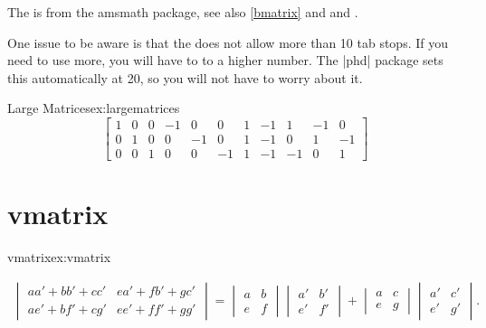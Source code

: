 The  is from the amsmath package, see also \vref{bmatrix} and  and \pageref{bmatrix}. 


One issue to be aware is that the  does not allow more than 10 tab stops. If you need to use more, you will have to  to a higher number. The |phd| package sets this automatically at 20, so you will not have to worry about it.

\begin{teX}
\setcounter{MaxMatrixCols}{20}
\end{teX}

\begin{texexample}{Large Matrices}{ex:largematrices}
\[
\begin{bmatrix}
1 & 0 & 0 & -1 & 0  & 0  & 1 & -1 & 1  & -1 & 0 \\
0 & 1 & 0 & 0  & -1 & 0  & 1 & -1 & 0  & 1  & -1 \\
0 & 0 & 1 & 0  & 0  & -1 & 1 & -1 & -1 & 0  & 1 
\end{bmatrix}
\]
\end{texexample}



\section{vmatrix}

\begin{texexample}{vmatrix}{ex:vmatrix}

\begin{gather}
\begin{vmatrix}
aa' + bb' + cc' & ea' + fb' + gc' \\
ae' + bf' + cg' & ee' + ff' + gg'
\end{vmatrix}
{} = \begin{vmatrix}
a & b \\
e & f
\end{vmatrix}  \begin{vmatrix}
a' & b' \\
e' & f'
\end{vmatrix} + \begin{vmatrix}
a & c \\
e & g
\end{vmatrix}  \begin{vmatrix}
a' & c' \\
e' & g'
\end{vmatrix}.
\end{gather}
\end{texexample}





